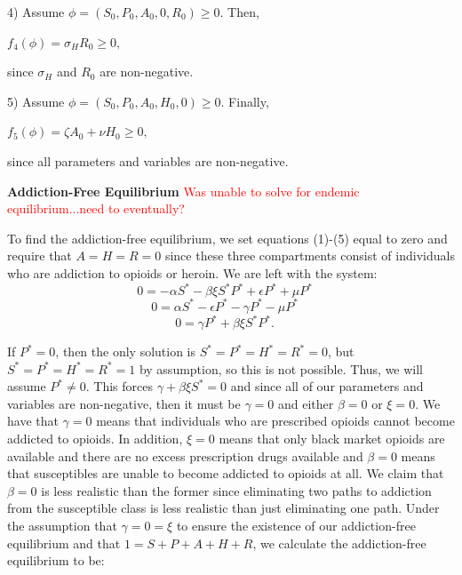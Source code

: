 \documentclass[12pt]{article}
\begin{document}
4) Assume $\phi = (S_0, P_0, A_0, 0, R_0) \geq 0.$ Then,
\begin{center}
$f_4(\phi)=\sigma_H R_0 \geq 0,$
\end{center}
since $\sigma_H$ and $R_0$ are non-negative. 
 
5)  Assume $\phi = (S_0, P_0, A_0, H_0, 0) \geq 0.$ Finally,
\begin{center}
$f_5(\phi)=\zeta A_0 +\nu H_0 \geq 0,$
\end{center}
since all parameters and variables are non-negative. 

 
\textbf{Addiction-Free Equilibrium} 
\textcolor{red}{Was unable to solve for endemic equilibrium...need to eventually?}

To find the addiction-free equilibrium, we set equations (1)-(5) equal to zero and require that $A=H=R=0$ since these three compartments consist of individuals who are addiction to opioids or heroin. We are left with the system: \\
\[0=-\alpha S^* -\beta \xi S^* P^* + \epsilon P^* +\mu P^* \quad\]
\[0=\alpha S^* - \epsilon P^* -\gamma P^* - \mu P^* \quad\]
\[0=\gamma P^* + \beta \xi S^* P^*.   \quad\]



If $P^*=0$, then the only solution is $S^*=P^*=H^*=R^*=0$, but $S^*=P^*=H^*=R^*=1$ by assumption, so this is not possible. Thus, we will assume $P^* \neq 0. $ This forces $\gamma + \beta \xi S^* =0$ and since all of our parameters and variables are non-negative, then it must be $\gamma=0$ and either $\beta=0$ or $\xi=0$. We have that $\gamma=0$ means that individuals who are prescribed opioids cannot become addicted to opioids. In addition, $\xi=0$ means that only black market opioids are available and there are no excess prescription drugs available and  $\beta=0$ means that susceptibles are unable to become addicted to opioids at all. We claim that $\beta=0$ is less realistic than the former since eliminating two paths to addiction from the susceptible class is less realistic than just eliminating one path. Under the assumption that $\gamma=0=\xi$ to ensure the existence of our addiction-free equilibrium and that $1=S+P+A+H+R$, we calculate the addiction-free equilibrium to be: \\
\end{document}
